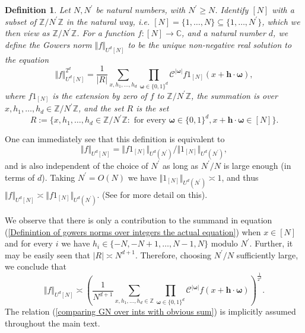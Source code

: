 \documentclass[12pt,a4paper,twoside,reqno]{amsart}
\newtheorem{Definition}[Theorem]{Definition}
\numberwithin{equation}{section}
\begin{document}
\begin{Definition}
\label{Definition of gowers norms over integers}
Let $N,N^\prime$ be natural numbers, with $N^\prime\geqslant N$. Identify $[N]$ with a subset of $\mathbb{Z}/N^\prime\mathbb{Z}$ in the natural way, i.e. $[N] = \{1,\dots,N\} \subseteq \{1,\dots,N^\prime\}$, which we then view as $\mathbb{Z}/N^\prime\mathbb{Z}$. For a function $f:[N]\longrightarrow \mathbb{C}$, and a natural number $d$, we define the Gowers norm $\Vert f\Vert_{U^d[N]}$ to be the unique non-negative real solution to the equation
\begin{equation}
\label{Definintion of gowers norms over integers the actual equation}
\Vert f\Vert_{U^d[N]} ^{2^d} = \frac{1}{\vert R\vert}\sum\limits_{x,h_1,\dots,h_d}\prod\limits_{\boldsymbol{\omega}\in \{0,1\}^d}\mathcal{C}^{\vert \boldsymbol{\omega} \vert} f1_{[N]}(x+\mathbf{h}\cdot\boldsymbol{\omega}),
\end{equation}
\noindent where $f1_{[N]}$ is the extension by zero of $f$ to $\mathbb{Z}/N^\prime\mathbb{Z}$, the summation is over\\ $x,h_1,\dots,h_d\in \mathbb{Z}/N^\prime\mathbb{Z}$, and the set $R$ is the set $$R:=\{x,h_1,\dots,h_d\in \mathbb{Z}/N^\prime\mathbb{Z}: \text{ for every } \boldsymbol{\omega}\in \{0,1\}^d, x+\mathbf{h}\cdot\boldsymbol{\omega}\in [N]\}.$$
\end{Definition}

One can immediately see that this definition is equivalent to $$\Vert f\Vert_{U^d[N]} = \Vert f1_{[N]}\Vert_{U^d(N^\prime)}/\Vert 1_{[N]}\Vert_{U^d(N^\prime)},$$ and is also independent of the choice of $N^\prime$ as long as $N^\prime/N$ is large enough (in terms of $d$). Taking $N^\prime = O(N)$ we have $\Vert 1_{[N]}\Vert_{U^d(N^\prime)}\asymp 1$, and thus $\Vert f\Vert_{U^d[N]}\asymp \Vert f1_{[N]}\Vert_{U^d(N^\prime)}$. (See \cite[Lemma B.5]{GT10} for more detail on this).

We observe that there is only a contribution to the summand in equation (\ref{Definintion of gowers norms over integers the actual equation}) when $x \in [N]$ and for every $i$ we have $ h_i \in \{-N,-N+1,\dots, N-1,N\} \text{ modulo } N^\prime$. Further, it may be easily seen that $\vert R\vert \asymp N^{d+1}$. Therefore, choosing $N^\prime/N$ sufficiently large, we conclude that 
\begin{equation}
\label{comparing GN over ints with obvious sum}
\Vert f\Vert_{U^d[N]} \asymp \left( \frac{1}{N^{d+1}}\sum\limits_{x,h_1,\dots,h_d\in \mathbb{Z}}\prod\limits_{\boldsymbol{\omega}\in \{0,1\}^d}\mathcal{C}^{\vert \boldsymbol{\omega} \vert} f(x+\mathbf{h}\cdot\boldsymbol{\omega})\right)^{\frac{1}{2^d}}.
\end{equation}
\noindent The relation (\ref{comparing GN over ints with obvious sum}) is implicitly assumed throughout the main text.\\
\end{document}
